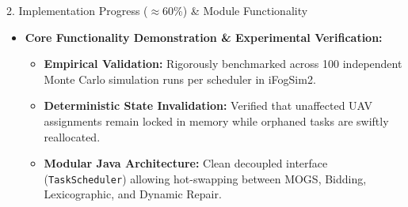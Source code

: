 \documentclass[aspectratio=169, 11pt]{beamer}
\begin{document}
\begin{frame}{2. Implementation Progress ($\approx$60\%) \& Module Functionality}
\begin{itemize}
        \item \textbf{Core Functionality Demonstration \& Experimental Verification:}
        \begin{itemize}\footnotesize
            \item \textbf{Empirical Validation:} Rigorously benchmarked across 100 independent Monte Carlo simulation runs per scheduler in iFogSim2.
            \item \textbf{Deterministic State Invalidation:} Verified that unaffected UAV assignments remain locked in memory while orphaned tasks are swiftly reallocated.
            \item \textbf{Modular Java Architecture:} Clean decoupled interface (\texttt{TaskScheduler}) allowing hot-swapping between MOGS, Bidding, Lexicographic, and Dynamic Repair.
        \end{itemize}
    \end{itemize}
\end{frame}

\end{document}
